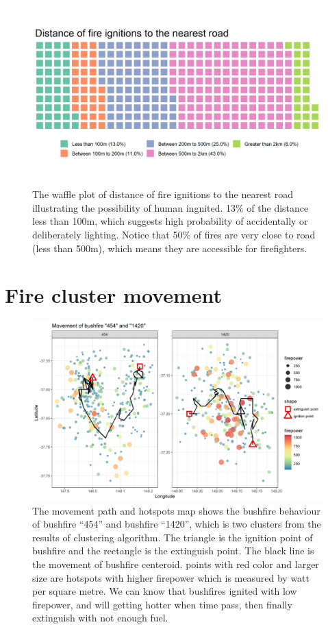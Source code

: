 \documentclass{monashthesis}
\begin{document}
\begin{figure}
\centering
\includegraphics[width=5.20833in]{figures/dist_to_road_waffle.jpg}
\caption{The waffle plot of distance of fire ignitions to the nearest
road illustrating the possibility of human ingnited. 13\% of the
distance less than 100m, which suggests high probability of accidentally
or deliberately lighting. Notice that 50\% of fires are very close to
road (less than 500m), which means they are accessible for
firefighters.}
\end{figure}

\section{Fire cluster movement}\label{fire-cluster-movement}

\begin{figure}
\centering
\includegraphics[width=5.20833in]{figures/fire_mov.jpg}
\caption{The movement path and hotspots map shows the bushfire behaviour
of bushfire ``454'' and bushfire ``1420'', which is two clusters from
the results of clustering algorithm. The triangle is the ignition point
of bushfire and the rectangle is the extinguish point. The black line is
the movement of bushfire centeroid. points with red color and larger
size are hotspots with higher firepower which is measured by watt per
square metre. We can know that bushfires ignited with low firepower, and
will getting hotter when time pass, then finally extinguish with not
enough fuel.}
\end{figure}
\end{document}
